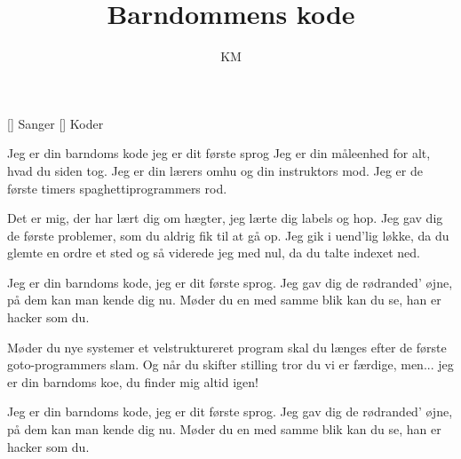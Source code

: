 \documentclass[a4paper,11pt]{article}
\title{Barndommens kode}
\author{KM}
\begin{document}
\maketitle

\begin{roles}
  [] Sanger
  [] Koder
\end{roles}

\begin{song}
  Jeg er din barndoms kode
  jeg er dit første sprog
  Jeg er din måleenhed
  for alt, hvad du siden tog.
  Jeg er din lærers omhu
  og din instruktors mod.
  Jeg er de første timers
  spaghettiprogrammers rod.

  Det er mig, der har lært dig om hægter,
  jeg lærte dig labels og hop.
  Jeg gav dig de første problemer,
  som du aldrig fik til at gå op.
  Jeg gik i uend'lig løkke,
  da du glemte en ordre et sted
  og så viderede jeg med nul,
  da du talte indexet ned.

  Jeg er din barndoms kode,
  jeg er dit første sprog.
  Jeg gav dig de rødranded' øjne,
  på dem kan man kende dig nu.
  Møder du en med samme blik
  kan du se, han er hacker som du.

  Møder du nye systemer
  et velstruktureret program
  skal du længes efter de første
  goto-programmers slam.
  Og når du skifter stilling
  tror du vi er færdige, men...
  jeg er din barndoms koe,
  du finder mig altid igen!


  Jeg er din barndoms kode,
  jeg er dit første sprog.
  Jeg gav dig de rødranded' øjne,
  på dem kan man kende dig nu.
  Møder du en med samme blik
  kan du se, han er hacker som du.

\end{song}
\end{document}
